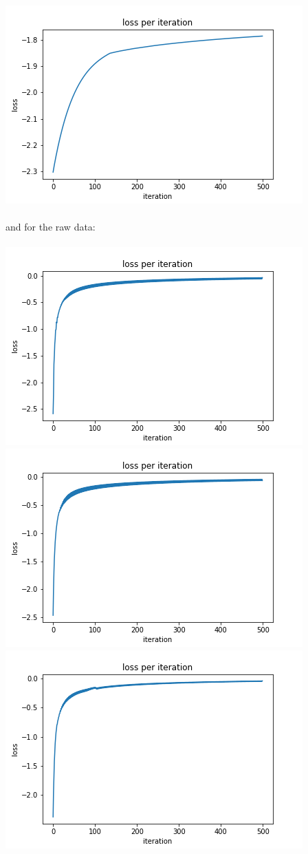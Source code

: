 \documentclass[11pt]{article}
\begin{document}
\includegraphics[scale=0.2]{images/loss_transform_0003}\\
 \\
and for the raw data:\\
 \\
\includegraphics[scale=0.2]{images/loss_no_transform_0000}
\includegraphics[scale=0.2]{images/loss_no_transform_0001}
\includegraphics[scale=0.2]{images/loss_no_transform_0002}
\end{document}
